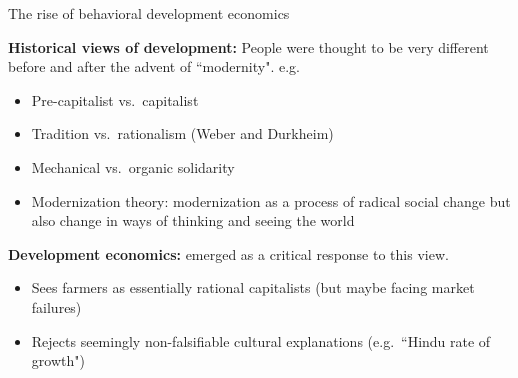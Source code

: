 \documentclass[aspectratio=169, 10pt, handout]{beamer}
\newenvironment{wideitemize}{\itemize\addtolength{\itemsep}{10pt}}{\enditemize}
\begin{document}
\begin{frame}{The rise of behavioral development economics}

\begin{wideitemize}

	\item \textbf{Historical views of development:} People were thought to be very different before and after the advent of ``modernity". e.g.\:

	\begin{itemize}

		\item Pre-capitalist vs.\ capitalist \citep{marx1967communist} 
		
		\item Tradition vs.\ rationalism (Weber and Durkheim)
        
		\item Mechanical vs.\ organic solidarity

		\item Modernization theory: modernization as a process of radical social change but also change in ways of thinking and seeing the world
	
	\end{itemize}

	\item \textbf{Development economics:} emerged as a critical response to this view.

	\begin{itemize}

		\item Sees farmers as essentially rational capitalists (but maybe facing market failures)
	
		\item Rejects seemingly non-falsifiable cultural explanations (e.g.\ ``Hindu rate of growth") 

	\end{itemize}


\end{wideitemize}

\end{frame}
\end{document}
